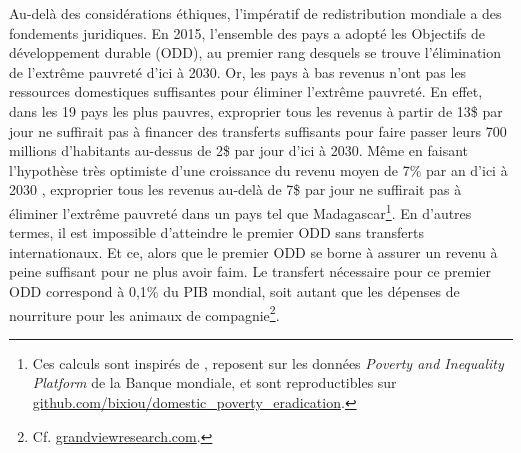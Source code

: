 \documentclass[a5paper,french]{memoir}
\begin{document}
Au-delà des considérations éthiques, l'impératif de redistribution mondiale a des fondements juridiques. En 2015, l'ensemble des pays a adopté les Objectifs de développement durable (ODD), au premier rang desquels se trouve l'élimination de l'extrême pauvreté d'ici à 2030. Or, les pays à bas revenus n'ont pas les ressources domestiques suffisantes pour éliminer l'extrême pauvreté. En effet,  dans les 19 pays les plus pauvres, exproprier tous les revenus à partir de 13\$ par jour ne suffirait pas à financer des transferts suffisants pour faire passer leurs 700 millions d'habitants au-dessus de 2\$ par jour d'ici à 2030. Même en faisant l'hypothèse très optimiste d'une croissance du revenu moyen de 7\% par an d'ici à 2030%
, exproprier tous les revenus au-delà de 7\$ par jour ne suffirait pas à éliminer l'extrême pauvreté dans un pays tel que Madagascar\footnote{Ces calculs sont inspirés de \citet{bolch_arithmetics_2022}, reposent sur les données \textit{Poverty and Inequality Platform} de la Banque mondiale, et sont reproductibles sur \href{https://github.com/bixiou/domestic\_poverty\_eradication/code\_poverty/main.R}{github.com/bixiou/domestic\_poverty\_eradication}.}. En d'autres termes, il est impossible d'atteindre le premier ODD sans transferts internationaux. Et ce, alors que le premier ODD se borne à assurer un revenu à peine suffisant pour ne plus avoir faim. Le transfert nécessaire pour ce premier ODD correspond à 0,1\% du PIB mondial, soit autant que les dépenses de nourriture pour les animaux de compagnie\footnote{Cf. \href{https://www.grandviewresearch.com/industry-analysis/pet-food-industry}{grandviewresearch.com}.}. %
\end{document}

